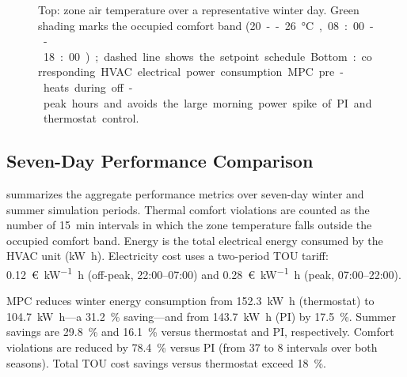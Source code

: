 \documentclass[conference,a4paper]{IEEEtran}[2015/08/26]
\begin{document}
\begin{figure}[t]
  \caption{Top: zone air temperature over a representative winter day.
    Green shading marks the occupied comfort band (\SI{20}--\SI{26}{\celsius},
    08:00--18:00); dashed line shows the setpoint schedule.
    Bottom: corresponding HVAC electrical power consumption.
    MPC pre-heats during off-peak hours and avoids the large morning
    power spike of PI and thermostat control.}
  \label{fig:temp}
\end{figure}

\subsection{Seven-Day Performance Comparison}

 summarizes the aggregate performance metrics over
seven-day winter and summer simulation periods. Thermal comfort
violations are counted as the number of \SI{15}{\minute} intervals in
which the zone temperature falls outside the occupied comfort band.
Energy is the total electrical energy consumed by the HVAC unit
(\si{\kilo\watt\hour}). Electricity cost uses a two-period TOU tariff:
\SI{0.12}{\euro\per\kilo\watt\hour} (off-peak, 22:00--07:00) and
\SI{0.28}{\euro\per\kilo\watt\hour} (peak, 07:00--22:00).

MPC reduces winter energy consumption from \SI{152.3}{\kilo\watt\hour}
(thermostat) to \SI{104.7}{\kilo\watt\hour}---a \SI{31.2}{\percent}
saving---and from \SI{143.7}{\kilo\watt\hour} (PI) by \SI{17.5}{\percent}.
Summer savings are \SI{29.8}{\percent} and \SI{16.1}{\percent} versus
thermostat and PI, respectively. Comfort violations are reduced by
\SI{78.4}{\percent} versus PI (from 37 to 8 intervals over both seasons).
Total TOU cost savings versus thermostat exceed \SI{18}{\percent}.
\end{document}
